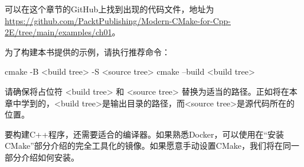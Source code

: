 可以在这个章节的GitHub上找到出现的代码文件，地址为 \url{https://github.com/PacktPublishing/Modern-CMake-for-Cpp-2E/tree/main/examples/ch01}。

为了构建本书提供的示例，请执行推荐命令：

\begin{shell}
cmake -B <build tree> -S <source tree>
cmake --build <build tree>
\end{shell}

请确保将占位符 <build tree> 和 <source tree> 替换为适当的路径。正如将在本章中学到的，<build tree>是输出目录的路径，而<source tree>是源代码所在的位置。

要构建C++程序，还需要适合的编译器。如果熟悉Docker，可以使用在“安装CMake”部分介绍的完全工具化的镜像。如果愿意手动设置CMake，我们将在同一部分介绍如何安装。










